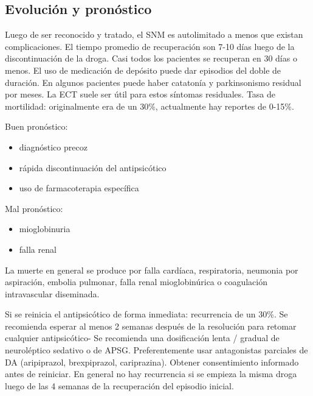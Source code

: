 \subsection*{Evolución y pronóstico}
Luego de ser reconocido y tratado, el SNM es autolimitado a menos que existan complicaciones. El tiempo promedio de recuperación son 7-10 días luego de la discontinuación de la droga. Casi todos los pacientes se recuperan en 30 días o menos. El uso de medicación de depósito puede dar episodios del doble de duración. En algunos pacientes puede haber catatonía y parkinsonismo residual por meses. La ECT suele ser útil para estos síntomas residuales.
Tasa de mortilidad: originalmente era de un 30\%, actualmente hay reportes de 0-15\%.

Buen pronóstico:
\begin{itemize}
	\item diagnóstico precoz
	\item rápida discontinuación del antipsicótico
	\item uso de farmacoterapia específica
\end{itemize}
Mal pronóstico:
\begin{itemize}
	\item mioglobinuria
	\item falla renal
\end{itemize}
La muerte en general se produce por falla cardíaca, respiratoria, neumonia por aspiración, embolia pulmonar, falla renal mioglobinúrica o coagulación intravascular diseminada.

Si se reinicia el antipsicótico de forma inmediata: recurrencia de un 30\%. Se recomienda esperar al menos 2 semanas después de la resolución para retomar cualquier antipsicótico- Se recomienda una dosificación lenta / gradual de neuroléptico sedativo o de APSG. Preferentemente usar antagonistas parciales de DA (aripiprazol, brexpiprazol, cariprazina). Obtener consentimiento informado antes de reiniciar. En general no hay recurrencia si se empieza la misma droga luego de las 4 semanas de la recuperación del episodio inicial.
\printbibliography[]